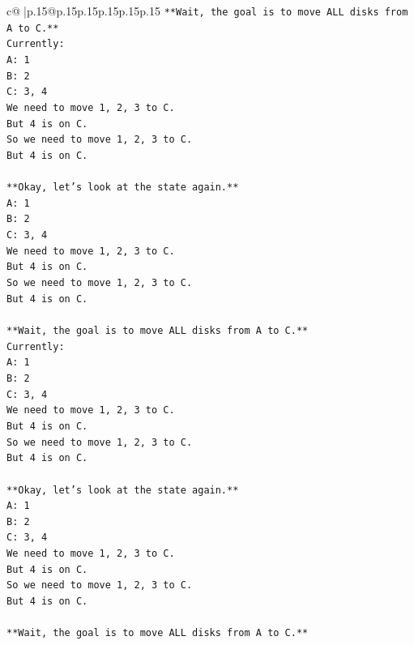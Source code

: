 \documentclass{article}
\begin{document}
{\begin{supertabular}{c@{$\;$}|p{.15\linewidth}@{}p{.15\linewidth}p{.15\linewidth}p{.15\linewidth}p{.15\linewidth}p{.15\linewidth}}
{{{\texttt{**Wait, the goal is to move ALL disks from A to C.**} \\
\texttt{Currently:} \\
\texttt{A: 1} \\
\texttt{B: 2} \\
\texttt{C: 3, 4} \\
\texttt{We need to move 1, 2, 3 to C.} \\
\texttt{But 4 is on C.} \\
\texttt{So we need to move 1, 2, 3 to C.} \\
\texttt{But 4 is on C.} \\
\\ 
\texttt{**Okay, let's look at the state again.**} \\
\texttt{A: 1} \\
\texttt{B: 2} \\
\texttt{C: 3, 4} \\
\texttt{We need to move 1, 2, 3 to C.} \\
\texttt{But 4 is on C.} \\
\texttt{So we need to move 1, 2, 3 to C.} \\
\texttt{But 4 is on C.} \\
\\ 
\texttt{**Wait, the goal is to move ALL disks from A to C.**} \\
\texttt{Currently:} \\
\texttt{A: 1} \\
\texttt{B: 2} \\
\texttt{C: 3, 4} \\
\texttt{We need to move 1, 2, 3 to C.} \\
\texttt{But 4 is on C.} \\
\texttt{So we need to move 1, 2, 3 to C.} \\
\texttt{But 4 is on C.} \\
\\ 
\texttt{**Okay, let's look at the state again.**} \\
\texttt{A: 1} \\
\texttt{B: 2} \\
\texttt{C: 3, 4} \\
\texttt{We need to move 1, 2, 3 to C.} \\
\texttt{But 4 is on C.} \\
\texttt{So we need to move 1, 2, 3 to C.} \\
\texttt{But 4 is on C.} \\
\\ 
\texttt{**Wait, the goal is to move ALL disks from A to C.**} \\
}}}
\end{supertabular}}
\end{document}
